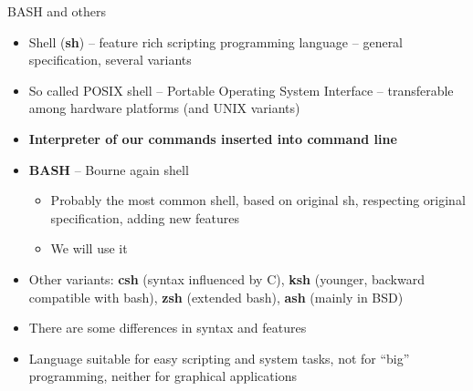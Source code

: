 \documentclass[compress, ucs, xelatex, 11pt, xcolor=svgnames,
  hyperref={
    bookmarks=true,
    unicode=true,
    colorlinks=true,
    pdftitle={Linux, command line and MetaCentrum},
    plainpages=false,
    pdfauthor={Vojtech Zeisek},
    pdfsubject={Course about use of Linux command line, writing shell scripts and using MetaCentrum of CESNET},
    pdfcreator={XeLaTeX},
    pdfkeywords={Linux, GNU, BASH, shell, command line, MetaCentrum},
    linkcolor=DarkRed,
    anchorcolor=DarkBlue,
    citecolor=Indigo,
    filecolor=NavyBlue,
    menucolor=DarkMagenta,
    urlcolor=DarkBlue,
    pdftex},
  url={hyphens, lowtilde} %
  ]{beamer}
\begin{document}
\begin{frame}{BASH and others}
  \begin{itemize}
    \item Shell (\textbf{sh}) -- feature rich scripting programming language -- general specification, several variants
    \item So called POSIX shell -- Portable Operating System Interface -- transferable among hardware platforms (and UNIX variants)
    \item \textbf{Interpreter of our commands inserted into command line}
    \item \textbf{BASH} -- Bourne again shell
    \begin{itemize}
      \item Probably the most common shell, based on original sh, respecting original specification, adding new features
      \item We will use it
    \end{itemize}
    \item Other variants: \textbf{csh} (syntax influenced by C), \textbf{ksh} (younger, backward compatible with bash), \textbf{zsh} (extended bash), \textbf{ash} (mainly in BSD)
    \item There are some differences in syntax and features
    \item Language suitable for easy scripting and system tasks, not for ``big'' programming, neither for graphical applications
  \end{itemize}
\end{frame}
\end{document}
